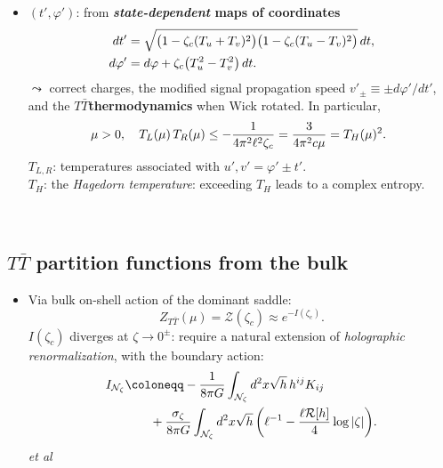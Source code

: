 \documentclass[10pt]{article}
\newcommand{\citations}[1]{{\footnotesize#1\par}}
\newcommand{\TTbar}{\texorpdfstring{\ensuremath{T\bar{T}}}{TTbar}\xspace}
\begin{document}
\begin{multicols}{3}
\begin{itemize}
	\item $(t',\varphi')$: from \textbf{\textit{state-dependent} maps of \mbox{coordinates}}
	\begin{align}
		dt' &= \sqrt{ \big(1 - \zeta_c (T_u+T_v)^2 \big) \big(1 - \zeta_c (T_u-T_v)^2 \big) } \, dt, \notag \\
		 d\varphi' &= d\varphi + \zeta_c \big( T_u^2 - T_v^2 \big)\,dt.
	\label{eq:state_dependent_map}
	\end{align}
	$\leadsto$ correct charges, the modified signal propagation speed $v'_{\pm} \equiv \pm {d\varphi'}/{dt'}$, and the \TTbar \textbf{thermodynamics} when Wick rotated. In particular,
	\begin{equation*}
	\hspace{-.5em} \mu > 0,\quad
		T_L(\mu)\,T_R(\mu) \le - \frac{1}{4\pi^2 \ell^2 \zeta_c} = \frac{3}{4\pi^2c\mu} = T_H(\mu)^2.
	\end{equation*}
	$T_{L,R}$: temperatures associated with $u',v' = \varphi' \pm t'$.\\
	$T_H$: the \textit{Hagedorn temperature}: exceeding $T_H$ leads to a complex entropy.

\begin{flushright}
\vspace{-\baselineskip}
\citations{
\textcite{Giveon:2017nie}\\
\textcite{Apolo:2019zai}
}
\vspace{-.8\baselineskip}
\end{flushright}

\end{itemize}

\subsection*{\TTbar partition functions from the bulk} \label{se:partitionfunction}

\begin{itemize}
\item Via bulk on-shell action of the dominant saddle:
	\begin{equation}
		Z_{T\bar T} (\mu) = \mathcal Z (\zeta_c) \approx  e^{-I(\zeta_c)}. \label{partition2}
	\end{equation}
$I(\zeta_c)$ \mbox{diverges} at $\zeta \to 0^\pm$: require a natural extension of \textit{holographic renormalization}, with the boundary action:
	\begin{align}
		I_{\mathcal N_{\zeta}} & \coloneqq  - \frac{1}{8\pi G} \int_{\mathcal N_{\zeta}} d^2x \sqrt{h}\,h^{ij} K_{ij} \notag
	\\& \qquad + \frac{\sigma_\zeta}{8\pi G} \int_{\mathcal N_{\zeta}} d^2x \sqrt{h} \, \bigg(\ell^{-1} - \frac{\ell  \mathcal{R}[h]}{4} \log |\zeta| \bigg). \label{boundaryaction}
	\end{align}
	\hfill{\footnotesize \textcite{Henningson:1998gx} \textit{et al}}


\end{itemize}
\end{multicols}
\end{document}

